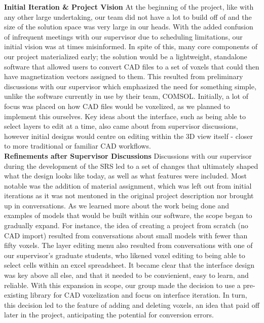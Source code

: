 \documentclass[12pt, titlepage]{article}
\begin{document}
\noindent\textbf{Initial Iteration \& Project Vision}
\newline
At the beginning of the project, like with any other large undertaking, our team did not have a lot 
to build off of and the size of the solution space was very large in our heads. With the added 
confusion of infrequent meetings with our supervisor due to scheduling limitations, our initial vision 
was at times misinformed. In spite of this, many core components of our project materialized early; 
the solution would be a lightweight, standalone software that allowed users to convert CAD files 
to a set of voxels that could then have magnetization vectors assigned to them. This resulted from 
preliminary discussions with our supervisor which emphasized the need for something simple, unlike the software
currently in use by their team, COMSOL. Initially, a lot of focus was placed on how CAD files would be 
voxelized, as we planned to implement this ourselves. Key ideas about the interface, such as being able 
to select layers to edit at a time, also came about from supervisor discussions, however initial designs
would centre on editing within the 3D view itself - closer to more traditional or familiar CAD workflows.\\

\noindent\textbf{Refinements after Supervisor Discussions}
\newline
Discussions with our supervisor during the development of the SRS led to a set of changes that ultimately
shaped what the design looks like today, as well as what features were included. Most notable was the 
addition of material assignment, which was left out from initial iterations as it was not mentoned in the
original project description nor brought up in conversations. As we learned more about the work being done 
and examples of models that would be built within our software, the scope began to gradually expand.
For instance, the idea of creating a project from scratch (no CAD import) resulted from conversations about 
small models with fewer than fifty voxels. The layer editing menu also resulted from conversations with one 
of our supervisor's graduate students, who likened voxel editing to being able to select cells within an excel
spreadsheet. It became clear that the interface design was key above all else, and that it needed to be 
convienient, easy to learn, and reliable. With this expansion in scope, our group made the decision to use
a pre-existing library for CAD voxelization and focus on interface iteration. In turn, this decision led to the
feature of adding and deleting voxels, an idea that paid off later in the project, anticipating the potential
for conversion errors.\\
\end{document}
